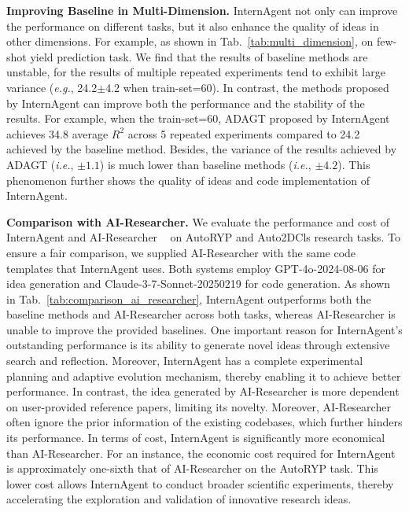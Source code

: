 \textbf{Improving Baseline in Multi-Dimension.} InternAgent not only can improve the performance on different tasks, but it also enhance the quality of ideas in other dimensions. For example, as shown in Tab.~\ref{tab:multi_dimension}, on few-shot yield prediction task. We find that the results of baseline methods are unstable, for the results of multiple repeated experiments tend to exhibit large variance (\textit{e.g.}, 24.2$\pm$4.2 when train-set=60). In contrast, the methods proposed by InternAgent can improve both the performance and the stability of the results. For example, when the train-set=60, ADAGT proposed by InternAgent achieves 34.8 average $R^2$ across 5 repeated experiments compared to 24.2 achieved by the baseline method. Besides, the variance of the results achieved by ADAGT (\textit{i.e.}, $\pm1.1$) is much lower than baseline methods (\textit{i.e.}, $\pm4.2$). This phenomenon further shows the quality of ideas and code implementation of InternAgent.

\textbf{Comparison with AI-Researcher.} We evaluate the performance and cost of InternAgent and AI-Researcher ~\citep{AiResearcher} on AutoRYP and Auto2DCls research tasks. To ensure a fair comparison, we supplied AI-Researcher with the same code templates that InternAgent uses. Both systems employ GPT-4o-2024-08-06 for idea generation and Claude-3-7-Sonnet-20250219 for code generation.  As shown in Tab.~\ref{tab:comparison_ai_researcher}, InternAgent outperforms both the baseline methods and AI-Researcher across both tasks, whereas AI-Researcher is unable to improve the provided baselines. One important reason for InternAgent's outstanding performance is its ability to generate novel ideas through extensive search and reflection.
Moreover, InternAgent has a complete experimental planning and adaptive evolution mechanism, thereby enabling it to achieve better performance.
In contrast, the idea generated by AI-Researcher is more dependent on user-provided reference papers, limiting its novelty.  Moreover, AI-Researcher often ignore the prior information of the existing codebases, which further hinders its performance. In terms of cost, InternAgent is significantly more economical than AI-Researcher. For an instance, the economic cost required for InternAgent is approximately one-sixth that of AI-Researcher on the AutoRYP task. This lower cost  allows InternAgent to conduct broader scientific experiments, thereby accelerating the exploration and validation of innovative research ideas.
